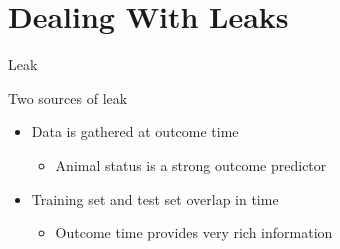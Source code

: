 \section{Dealing With Leaks}

\begin{frame}[c]{Leak}
	\begin{block}{Two sources of leak}
		\begin{itemize}
			\item Data is gathered at outcome time
				\begin{itemize}
					\item Animal status is a strong outcome predictor
				\end{itemize}
			\item Training set and test set overlap in time
				\begin{itemize}
					\item Outcome time provides very rich information
				\end{itemize}
		\end{itemize}
	\end{block}
\end{frame}
